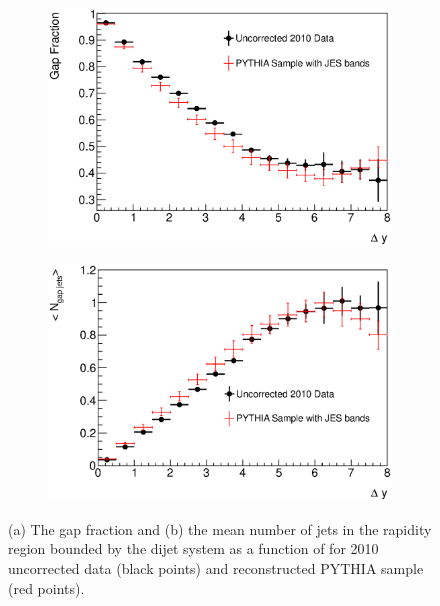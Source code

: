 \begin{figure}
\centering
        \begin{subfigure}[b]{0.5\textwidth}
                \centering
                \includegraphics[width=\textwidth]{figures/GBJ2/ControlPlots/Smeared__GapFraction_deltaY.eps}
        \end{subfigure}%
        \begin{subfigure}[b]{0.5\textwidth}
                \centering
                \includegraphics[width=\textwidth]{figures/GBJ2/ControlPlots/Smeared__prof_deltaY_njets.eps}
        \end{subfigure}%
\caption[Comparison of the data and PYTHIA for the gap fraction and mean number of jets]{
(a) The gap fraction  and (b) the mean number of jets in the rapidity region bounded by the dijet system as a function of \dy{} for 2010 uncorrected data (black points) and reconstructed PYTHIA sample (red points).
\label{GBJ2:Uncorr:Incl_Gap}}
\end{figure}



